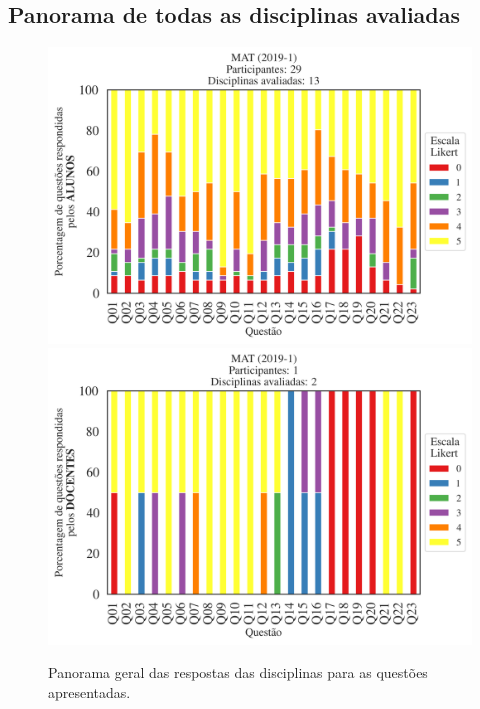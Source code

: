 \documentclass[a4paper,10pt]{article}
\begin{document}
\subsection{Panorama de todas as disciplinas avaliadas}
\begin{figure}[h]
\centering
\includegraphics[width=0.85\linewidth]{analise_geral_departamento_MAT_ALUNO_TURMA.png}
\includegraphics[width=0.85\linewidth]{analise_geral_departamento_MAT_DOCENTE_TURMA.png}
\caption{\label{fig:analise_geral_departamento}            Panorama geral das respostas das disciplinas para as questões apresentadas.}
\end{figure}
\end{document}
